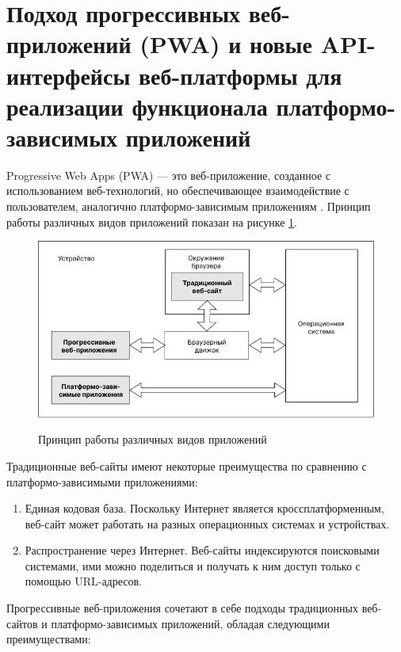 \section{Подход прогрессивных веб-приложений (PWA) и новые API-интерфейсы веб-платформы для реализации функционала платформо-зависимых приложений}

Progressive Web Apps (PWA) — это веб-приложение, созданное с использованием веб-технологий, но обеспечивающее взаимодействие с пользователем, аналогично платформо-зависимым приложениям \cite{pwaJason}. Принцип работы различных видов приложений показан на рисунке \ref{fig:pwa-environment}.

\begin{figure}[H]
\begin{center}
\includegraphics[width=1.0\hsize]{fig/pwa-environment.png}\\[2mm]
\caption{Принцип работы различных видов приложений}\label{fig:pwa-environment}
\end{center}
\end{figure}

Традиционные веб-сайты имеют некоторые преимущества по сравнению с платформо-зависимыми приложениями:

\begin{enumerate} 
  \item Единая кодовая база. Поскольку Интернет является кроссплатформенным, веб-сайт может работать на разных операционных системах и устройствах.
  
  \item Распространение через Интернет. Веб-сайты индексируются поисковыми системами, ими можно поделиться и получать к ним доступ только с помощью URL-адресов.
\end{enumerate}

Прогрессивные веб-приложения сочетают в себе подходы традиционных веб-сайтов и платформо-зависимых приложений, обладая следующими преимуществами:

